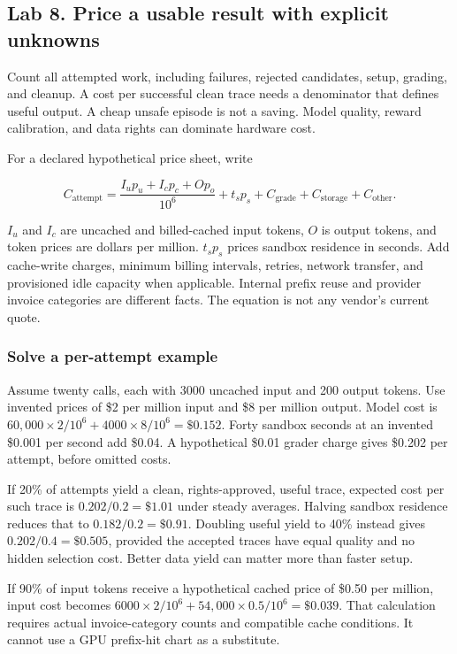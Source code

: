 \documentclass[
  11pt,
  letterpaper,
]{article}
\begin{document}
\subsection{Lab 8. Price a usable result with explicit
unknowns}\label{lab-8.-price-a-usable-result-with-explicit-unknowns}

Count all attempted work, including failures, rejected candidates,
setup, grading, and cleanup. A cost per successful clean trace needs a
denominator that defines useful output. A cheap unsafe episode is not a
saving. Model quality, reward calibration, and data rights can dominate
hardware cost.

For a declared hypothetical price sheet, write

\[C_{\mathrm{attempt}}=\frac{I_u p_u+I_c p_c+O p_o}{10^6}
+t_s p_s+C_{\mathrm{grade}}+C_{\mathrm{storage}}+C_{\mathrm{other}}.\]

\(I_u\) and \(I_c\) are uncached and billed-cached input tokens, \(O\)
is output tokens, and token prices are dollars per million. \(t_s p_s\)
prices sandbox residence in seconds. Add cache-write charges, minimum
billing intervals, retries, network transfer, and provisioned idle
capacity when applicable. Internal prefix reuse and provider invoice
categories are different facts. The equation is not any vendor's current
quote.

\subsubsection{Solve a per-attempt
example}\label{solve-a-per-attempt-example}

Assume twenty calls, each with 3000 uncached input and 200 output
tokens. Use invented prices of \$2 per million input and \$8 per million
output. Model cost is \(60{,}000\times2/10^6+4000\times8/10^6=\$0.152\).
Forty sandbox seconds at an invented \$0.001 per second add \$0.04. A
hypothetical \$0.01 grader charge gives \$0.202 per attempt, before
omitted costs.

If 20\% of attempts yield a clean, rights-approved, useful trace,
expected cost per such trace is \(0.202/0.2=\$1.01\) under steady
averages. Halving sandbox residence reduces that to
\(0.182/0.2=\$0.91\). Doubling useful yield to 40\% instead gives
\(0.202/0.4=\$0.505\), provided the accepted traces have equal quality
and no hidden selection cost. Better data yield can matter more than
faster setup.

If 90\% of input tokens receive a hypothetical cached price of \$0.50
per million, input cost becomes
\(6000\times2/10^6+54{,}000\times0.5/10^6=\$0.039\). That calculation
requires actual invoice-category counts and compatible cache conditions.
It cannot use a GPU prefix-hit chart as a substitute.
\end{document}
